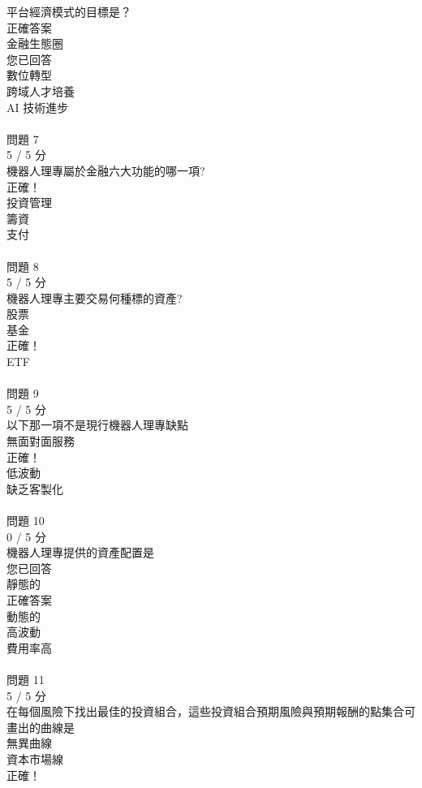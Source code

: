 \begin{multicols}{3}
平台經濟模式的目標是？\\
正確答案\\
  金融生態圈 \\
您已回答\\
  數位轉型 \\
  跨域人才培養 \\
  AI 技術進步 \\
 \\
問題 7\\
5 / 5 分\\
機器人理專屬於金融六大功能的哪一項?\\
正確！\\
  投資管理 \\
  籌資 \\
  支付 \\
 \\
問題 8\\
5 / 5 分\\
機器人理專主要交易何種標的資產?\\
  股票 \\
  基金 \\
正確！\\
  ETF \\
 \\
問題 9\\
5 / 5 分\\
以下那一項不是現行機器人理專缺點\\
  無面對面服務 \\
正確！\\
  低波動 \\
  缺乏客製化 \\
 \\
問題 10\\
0 / 5 分\\
機器人理專提供的資產配置是\\
您已回答\\
  靜態的 \\
正確答案\\
  動態的 \\
  高波動 \\
  費用率高 \\
 \\
問題 11\\
5 / 5 分\\
在每個風險下找出最佳的投資組合，這些投資組合預期風險與預期報酬的點集合可畫出的曲線是\\
  無異曲線 \\
  資本市場線 \\
正確！\\

\end{multicols}
